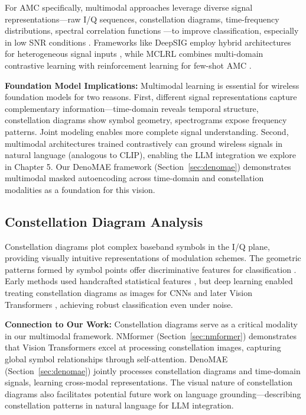 For AMC specifically, multimodal approaches leverage diverse signal representations—raw I/Q sequences, constellation diagrams, time-frequency distributions, spectral correlation functions \cite{xu2025mclrl}—to improve classification, especially in low SNR conditions \cite{li2022amcmlp}. Frameworks like DeepSIG employ hybrid architectures for heterogeneous signal inputs \cite{qiu2023deepsig}, while MCLRL combines multi-domain contrastive learning with reinforcement learning for few-shot AMC \cite{xu2025mclrl}.

\textbf{Foundation Model Implications:} Multimodal learning is essential for wireless foundation models for two reasons. First, different signal representations capture complementary information—time-domain reveals temporal structure, constellation diagrams show symbol geometry, spectrograms expose frequency patterns. Joint modeling enables more complete signal understanding. Second, multimodal architectures trained contrastively can ground wireless signals in natural language (analogous to CLIP), enabling the LLM integration we explore in Chapter 5. Our DenoMAE framework (Section~\ref{sec:denomae}) demonstrates multimodal masked autoencoding across time-domain and constellation modalities as a foundation for this vision.

\subsection{Constellation Diagram Analysis}

Constellation diagrams plot complex baseband symbols in the I/Q plane, providing visually intuitive representations of modulation schemes. The geometric patterns formed by symbol points offer discriminative features for classification \cite{sun2022automatic}. Early methods used handcrafted statistical features \cite{mobasseri2000digital}, but deep learning enabled treating constellation diagrams as images for CNNs \cite{hermawan2020cnn, rajendran2018deep} and later Vision Transformers \cite{wang2023automatic}, achieving robust classification even under noise.

\textbf{Connection to Our Work:} Constellation diagrams serve as a critical modality in our multimodal framework. NMformer (Section~\ref{sec:nmformer}) demonstrates that Vision Transformers excel at processing constellation images, capturing global symbol relationships through self-attention. DenoMAE (Section~\ref{sec:denomae}) jointly processes constellation diagrams and time-domain signals, learning cross-modal representations. The visual nature of constellation diagrams also facilitates potential future work on language grounding—describing constellation patterns in natural language for LLM integration.

